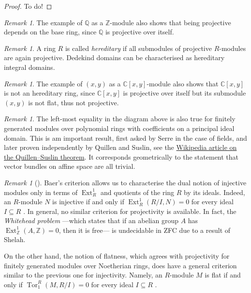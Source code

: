 \documentclass[A4paper, 12pt, british, reqno]{amsart}
\newcommand{\C}{\mathbb{C}} %
\newcommand{\Q}{\mathbb{Q}} %
\newcommand{\Z}{\mathbb{Z}} %
\theoremstyle{plain}
\theoremstyle{definition}
\theoremstyle{remark}
\newtheorem{rem}[thm]{Remark}
\theoremstyle{plain}
\theoremstyle{definition}
\theoremstyle{remark}
\theoremstyle{plain}
\theoremstyle{definition}
\theoremstyle{remark}
\DeclareMathOperator{\Ext}{Ext}
\DeclareMathOperator{\Tor}{Tor}
\begin{document}
{\color{gray}
\begin{proof}
    To do!
\end{proof}
}

\begin{rem}
    The example of $\Q$ as a $\Z$-module also shows that being projective depends on the base ring, since $\Q$ is projective over itself.
\end{rem}

\begin{rem}
    A ring $R$ is called \textit{hereditary} if all submodules of projective $R$-modules are again projective.
    Dedekind domains can be characterised as hereditary integral domains.
\end{rem}

\begin{rem}
    The example of $(x,y)$ as a $\C[x,y]$-module also shows that $\C[x,y]$ is not an hereditary ring, since $\C[x,y]$ is projective over itself but its submodule $(x,y)$ is not flat, thus not projective.
\end{rem}

\begin{rem}
    The left-most equality in the diagram above is also true for finitely generated modules over polynomial rings with coefficients on a principal ideal domain.
    This is am important result, first asked by Serre in the case of fields, and later proven independently by Quillen and Suslin, see the \href{https://en.wikipedia.org/wiki/Quillen-Suslin_theorem}{Wikipedia article on the Quillen--Suslin theorem}.
    It corresponds geometrically to the statement that vector bundles on affine space are all trivial.
\end{rem}

\begin{rem}[{\cite{fra18}}]
    Baer's criterion \cite[Prop.~1.1.1]{fra18} allows us to characterise the dual notion of injective modules only in terms of $\Ext^{1}_{R}$ and quotients of the ring $R$ by its ideals.
    Indeed, an $R$-module $N$ is injective if and only if $\Ext^{1}_{R}(R/I,N)=0$ for every ideal $I\subseteq R$ \cite[Prop.~1.1.4]{fra18}.
    In general, no similar criterion for projectivity is available.
    In fact, the \textit{Whitehead problem} ---which states that if an abelian group $A$ has $\Ext^{1}_{\Z}(A,\Z)=0$, then it is free--- is undecidable in ZFC due to a result of Shelah.

    On the other hand, the notion of flatness, which agrees with projectivity for finitely generated modules over Noetherian rings, does have a general criterion similar to the previous one for injectivity.
    Namely, an $R$-module $M$ is flat if and only if $\Tor_{1}^{R}(M,R/I)=0$ for every ideal $I\subseteq R$ \cite[Prop.~1.2.3]{fra18}.
\end{rem}
\end{document}
